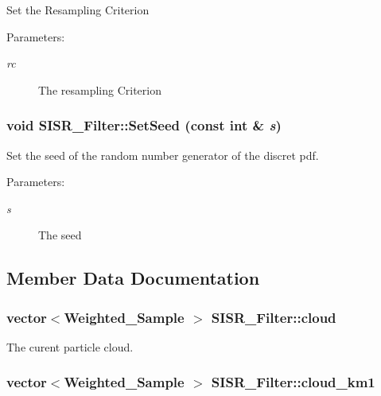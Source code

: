 Set the Resampling Criterion

\begin{Desc}
\item[Parameters:]
\begin{description}
\item[{\em rc}]The resampling Criterion \end{description}
\end{Desc}
\hypertarget{class_s_i_s_r___filter_5044fef30828c3303ad1dbc83cadcc06}{
\subsubsection[{SetSeed}]{\setlength{\rightskip}{0pt plus 5cm}void SISR\_\-Filter::SetSeed (const int \& {\em s})}}
\label{class_s_i_s_r___filter_5044fef30828c3303ad1dbc83cadcc06}


Set the seed of the random number generator of the discret pdf. 

\begin{Desc}
\item[Parameters:]
\begin{description}
\item[{\em s}]The seed \end{description}
\end{Desc}


\subsection{Member Data Documentation}
\hypertarget{class_s_i_s_r___filter_7ac75002d39baceda7ef98f1551243bd}{
\subsubsection[{cloud}]{\setlength{\rightskip}{0pt plus 5cm}vector$<${\bf Weighted\_\-Sample} $>$ {\bf SISR\_\-Filter::cloud}}}
\label{class_s_i_s_r___filter_7ac75002d39baceda7ef98f1551243bd}


The curent particle cloud. 

\hypertarget{class_s_i_s_r___filter_abf9ea165b2caafbe8b0ed1f4182419e}{
\subsubsection[{cloud\_\-km1}]{\setlength{\rightskip}{0pt plus 5cm}vector$<${\bf Weighted\_\-Sample} $>$ {\bf SISR\_\-Filter::cloud\_\-km1}}}
\label{class_s_i_s_r___filter_abf9ea165b2caafbe8b0ed1f4182419e}


